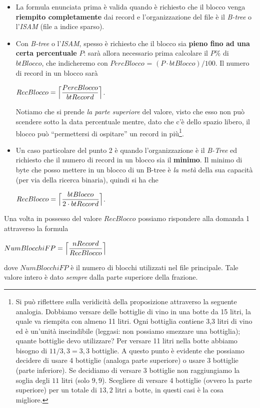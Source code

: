  \begin{itemize}
  \item La formula enunciata prima è valida quando è richiesto che il blocco venga \textbf{riempito completamente} dai record e 
 l'organizzazione del file è il \emph{B-tree} o l'\emph{ISAM} (file a indice sparso).
  \item Con \emph{B-tree} o l'\emph{ISAM}, spesso è richiesto che il blocco sia \textbf{pieno fino ad una certa percentuale} $P$:
  sarà allora necessario prima calcolare il $P\%$ di $btBlocco$, che indicheremo con $PercBlocco$ = $(P \cdot btBlocco)/100$. Il numero
  di record in un blocco sarà
  \begin{center}
  $RecBlocco = \Bigl\lceil \dfrac{PercBlocco}{btRecord} \Bigr\rceil$.
  \end{center}
  Notiamo che si prende \emph{la parte superiore} del valore, visto che esso non può scendere sotto la data percentuale mentre, 
   dato che c'è dello spazio libero, il blocco può ``permettersi di ospitare'' un record in più\footnote{Si può riflettere sulla
  veridicità della proposizione attraverso la seguente analogia.
  Dobbiamo versare delle bottiglie di vino in una botte da 15 litri, la quale va riempita con almeno 11 litri. 
  Ogni bottiglia contiene 3,3 litri di vino ed è un'unità inscindibile (leggasi: non possiamo smezzare una bottiglia); quante bottiglie
  devo utilizzare? Per versare 11 litri nella botte abbiamo bisogno di $11/3,3=3,3$ bottiglie. A questo punto è evidente che 
  possiamo decidere di usare 4 bottiglie (analoga parte superiore) o usare 3 bottiglie (parte inferiore). Se decidiamo di versare 
  3 bottiglie non raggiungiamo la soglia degli $11$ litri (solo $9,9$). Scegliere di versare 4 bottiglie (ovvero 
  la parte superiore) per un totale di $13,2$ litri a botte, in questi casi è la cosa migliore.}.  
  \item Un caso particolare del punto 2 è quando l'organizzazione è il \emph{B-Tree} ed richiesto che il numero di record in un blocco
  sia il \textbf{minimo}. Il minimo di byte che posso mettere in un blocco di un B-tree è \emph{la metà} della sua capacità
  (per via della ricerca binaria), quindi si ha che
   \begin{center}
  $RecBlocco = \Bigl\lceil \dfrac{btBlocco}{2\cdot btRecord} \Bigr\rceil$.\\
  \end{center}
 \end{itemize}
 
  Una volta in possesso del valore $RecBlocco$ possiamo rispondere alla domanda 1 attraverso la formula
  \begin{center}
   $NumBlocchiFP = \Bigl\lceil\dfrac{nRecord}{RecBlocco}\Bigr\rceil$
  \end{center}
  dove $NumBlocchiFP$ è il numero di blocchi utilizzati nel file principale. Tale valore intero è dato \emph{sempre} dalla parte 
  superiore della frazione.\\
  
